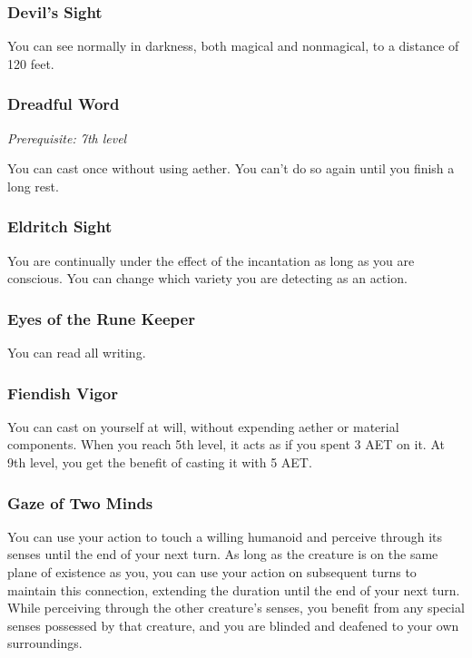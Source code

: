 \subsubsection{Devil's Sight}

You can see normally in darkness, both magical and nonmagical, to a distance of 120 feet.

\subsubsection{Dreadful Word}

\textit{Prerequisite: 7th level}

You can cast  once without using aether. You can't do so again until you finish a long rest.

\subsubsection{Eldritch Sight}

You are continually under the effect of the  incantation as long as you are conscious. You can change which variety you are detecting as an action.

\subsubsection{Eyes of the Rune Keeper}

You can read all writing.

\subsubsection{Fiendish Vigor}

You can cast  on yourself at will, without expending aether or material components. When you reach 5th level, it acts as if you spent 3 AET on it. At 9th level, you get the benefit of casting it with 5 AET.

\subsubsection{Gaze of Two Minds}

You can use your action to touch a willing humanoid and perceive through its senses until the end of your next turn. As long as the creature is on the same plane of existence as you, you can use your action on subsequent turns to maintain this connection, extending the duration until the end of your next turn. While perceiving through the other creature's senses, you benefit from any special senses possessed by that creature, and you are blinded and deafened to your own surroundings.

